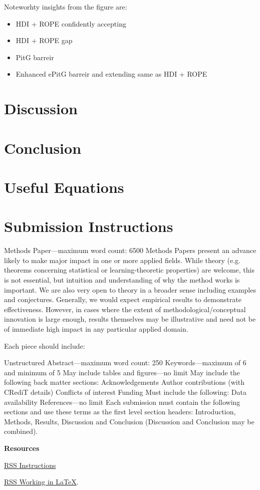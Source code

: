 \documentclass{article}
\begin{document}
Noteworhty insights from the figure are:
\begin{itemize}
  \item HDI + ROPE confidently accepting
  \item HDI + ROPE gap
  \item PitG barreir
  \item Enhanced ePitG barreir and extending same as HDI + ROPE
\end{itemize}

\section{Discussion}

\section{Conclusion}

\section{Useful Equations}


\section{Submission Instructions}

Methods Paper—maximum word count: 6500
Methods Papers present an advance likely to make major impact in one or more applied
fields. While theory (e.g. theorems concerning statistical or
learning-theoretic properties) are welcome, this is not essential, but intuition and
understanding of why the method works is important.
We are also very open to theory in a broader sense including examples and conjectures.
Generally, we would expect empirical results to demonstrate effectiveness.
However, in cases where the extent of methodological/conceptual innovation is large
enough, results themselves may be illustrative and need not be of immediate high impact
in any particular applied domain.

Each piece should include:

Unstructured Abstract—maximum word count: 250
Keywords—maximum of 6 and minimum of 5
May include tables and figures—no limit
May include the following back matter sections:
Acknowledgements
Author contributions (with CRediT details)
Conflicts of interest
Funding
Must include the following:
Data availability
References—no limit
Each submission must contain the following sections and use these terms as the first
level section headers: Introduction, Methods, Results, Discussion and Conclusion
(Discussion and Conclusion may be combined).

{\bf Resources}

\href{https://academic.oup.com/rssdat/pages/general-instructions}{RSS Instructions} 

\href{https://academic.oup.com/pages/authoring/books/preparing-your-manuscript/working-in-latex}{RSS Working in \LaTeX}.


\end{document}
